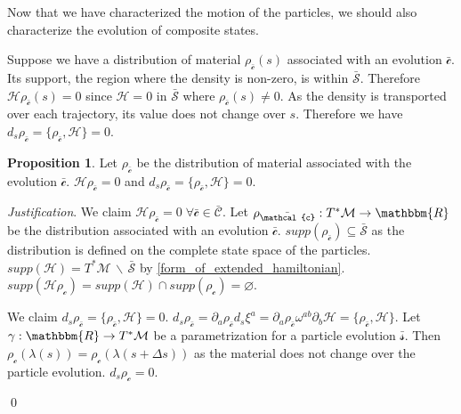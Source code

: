 \documentclass[aps,pra,10pt,twocolumn,floatfix,nofootinbib]{revtex4-1}
\numberwithin{equation}{section}
\theoremstyle{definition}
\newtheorem{prop}[equation]{Proposition}
\newenvironment{justification}{\emph{Justification}.}{\qed}
\begin{document}
Now that we have characterized the motion of the particles, we should also characterize the evolution of composite states.

Suppose we have a distribution of material $\rho_{\bar{\mathcal{c}}}(s)$ associated with an evolution $\bar{\mathcal{c}}$. Its support, the region where the density is non-zero, is within $\bar{\mathcal{S}}$. Therefore  $\mathcal{H} \rho_{\bar{\mathcal{c}}}(s) = 0$ since $\mathcal{H} = 0$ in $\bar{\mathcal{S}}$ where $\rho_{\bar{\mathcal{c}}}(s) \neq 0$. As the density is transported over each trajectory, its value does not change over $s$. Therefore we have $d_s \rho_{\bar{\mathcal{c}}} = \{ \rho_{\bar{\mathcal{c}}}, \mathcal{H} \} = 0$.

\begin{prop}\label{relativistic_distribution_evolution}
	Let $\rho_{\bar{\mathcal{c}}}$ be the distribution of material associated with the evolution $\bar{\mathcal{c}}$. $\mathcal{H} \rho_{\bar{\mathcal{c}}} = 0$ and $d_s \rho_{\bar{\mathcal{c}}} = \{ \rho_{\bar{\mathcal{c}}}, \mathcal{H} \} = 0$.
\end{prop}

\begin{justification}
	We claim $\mathcal{H} \rho_{\bar{\mathcal{c}}} = 0 \; \forall \bar{\mathcal{c}} \in \bar{\mathcal{C}}$. Let $\rho_{\bar{\mathcal{c}}} : T^*\mathcal{M} \rightarrow \mathbbm{R}$ be the distribution associated with an evolution $\bar{\mathcal{c}}$. $supp(\rho_{\bar{\mathcal{c}}}) \subseteq \bar{\mathcal{S}}$ as the distribution is defined on the complete state space of the particles. $supp(\mathcal{H}) = T^*\mathcal{M} \,\backslash\, \bar{\mathcal{S}}$ by \ref{form_of_extended_hamiltonian}. $supp(\mathcal{H} \rho_\mathcal{c}) = supp(\mathcal{H}) \cap supp(\rho_\mathcal{c}) = \varnothing$.
	
	We claim $d_s \rho_{\bar{\mathcal{c}}} = \{ \rho_{\bar{\mathcal{c}}}, \mathcal{H} \} = 0$. $d_s \rho_{\bar{\mathcal{c}}}= \partial_a \rho_{\bar{\mathcal{c}}} d_s \xi^a = \partial_a \rho_{\bar{\mathcal{c}}} \omega^{ab} \partial_b \mathcal{H} = \{ \rho_{\bar{\mathcal{c}}}, \mathcal{H} \}$. Let $\gamma : \mathbbm{R} \rightarrow T^*\mathcal{M}$ be a parametrization for a particle evolution $\bar{\mathcal{s}}$. Then $\rho_\mathcal{c}(\lambda(s)) = \rho_\mathcal{c}(\lambda(s + \Delta s))$ as the material does not change over the particle evolution. $d_s \rho_\mathcal{c} = 0$.
	
\end{justification}
\end{document}
